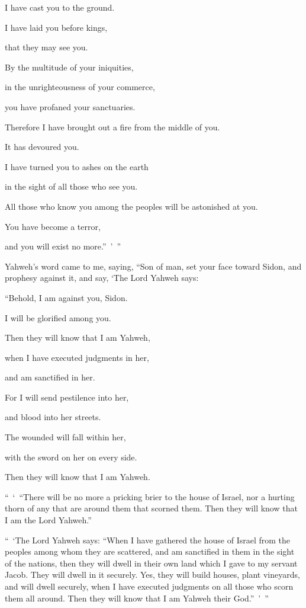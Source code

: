 {\par }{\Q I have cast you to the ground.
\par }{\QB I have laid you before kings,
\par }{\QB that they may see you.
\par }{\Q {}By the multitude of your iniquities,
\par }{\QB in the unrighteousness of your commerce,
\par }{\QB you have profaned your sanctuaries.
\par }{\Q Therefore I have brought out a fire from the middle of you.
\par }{\QB It has devoured you.
\par }{\Q I have turned you to ashes on the earth
\par }{\QB in the sight of all those who see you.
\par }{\Q {}All those who know you among the peoples will be astonished at you.
\par }{\QB You have become a terror,
\par }{\QB and you will exist no more.” ’ ”
\par }{\BB \par }{\PP {}Yahweh’s word came to me, saying,
“Son of man, set your face toward Sidon, and prophesy against it,
and say, ‘The Lord Yahweh says:
\par }{\Q “Behold, I am against you, Sidon.
\par }{\QB I will be glorified among you.
\par }{\Q Then they will know that I am Yahweh,
\par }{\QB when I have executed judgments in her,
\par }{\QB and am sanctified in her.
\par }{\Q {}For I will send pestilence into her,
\par }{\QB and blood into her streets.
\par }{\Q The wounded will fall within her,
\par }{\QB with the sword on her on every side.
\par }{\QB Then they will know that I am Yahweh.
\par }{\PP {}“ ‘ “There will be no more a pricking brier to the house of Israel, nor a hurting thorn of any that are around them that scorned them. Then they will know that I am the Lord Yahweh.”
\par }{\PP {}“ ‘The Lord Yahweh says: “When I have gathered the house of Israel from the peoples among whom they are scattered, and am sanctified in them in the sight of the nations, then they will dwell in their own land which I gave to my servant Jacob.
They will dwell in it securely. Yes, they will build houses, plant vineyards, and will dwell securely, when I have executed judgments on all those who scorn them all around. Then they will know that I am Yahweh their God.” ’ ”

}
